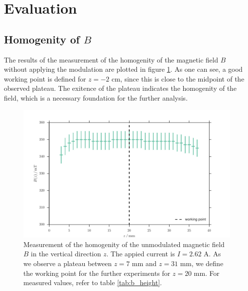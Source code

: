\section{Evaluation}
\subsection{Homogenity of $B$}
The results of the measurement of the homogenity of the magnetic field $B$ 
without applying the modulation are plotted in figure 
\ref{fig:b_height}. As one can see, a good working point is defined for $z = -2$ cm, since 
this is close to the midpoint of the observed plateau. The exitence of the plateau indicates the homogenity 
of the field, which is a necessary foundation for the further analysis.
\begin{figure}
\includegraphics[width=\textwidth]{figures/b_height.pdf}
\caption{   
    Measurement of the homogenity of the unmodulated magnetic field $B$ in the vertical direction $z$. 
    The appied current is $I = 2.62$ A. As we observe a plateau between $z = 7$ mm and $z = 31$ mm, 
    we define the working point for the further experiments for $z = 20$ mm.
    For measured values, refer to table \ref{tab:b_height}.
    }
\label{fig:b_height}
\end{figure}
\FloatBarrier


